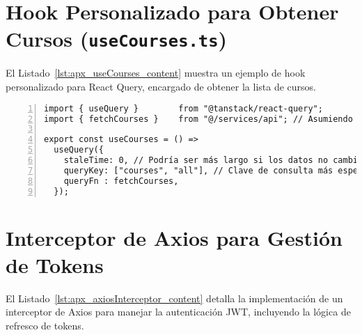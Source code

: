 \section{Hook Personalizado para Obtener Cursos (\texttt{useCourses.ts})}
\label{apx_ssec:useCourses_hook}
El Listado~\ref{lst:apx_useCourses_content} muestra un ejemplo de hook personalizado para React Query, encargado de obtener la lista de cursos.

\begin{lstlisting}[language=tsx,
  caption={Hook React Query \texttt{useCourses.ts} para la carga de cursos.},
  label={lst:apx_useCourses_content},
  basicstyle=\footnotesize\ttfamily,
  breaklines=true,
  frame=tb,
  numbers=left,
  numberstyle=\tiny\color{gray}
]
import { useQuery }        from "@tanstack/react-query";
import { fetchCourses }    from "@/services/api"; // Asumiendo que fetchCourses está en @/services/api

export const useCourses = () =>
  useQuery({
    staleTime: 0, // Podría ser más largo si los datos no cambian frecuentemente
    queryKey: ["courses", "all"], // Clave de consulta más específica
    queryFn : fetchCourses,
  });
\end{lstlisting}

\section{Interceptor de Axios para Gestión de Tokens}
\label{apx_ssec:axios_interceptor_code}
El Listado~\ref{lst:apx_axiosInterceptor_content} detalla la implementación de un interceptor de Axios para manejar la autenticación JWT, incluyendo la lógica de refresco de tokens.

